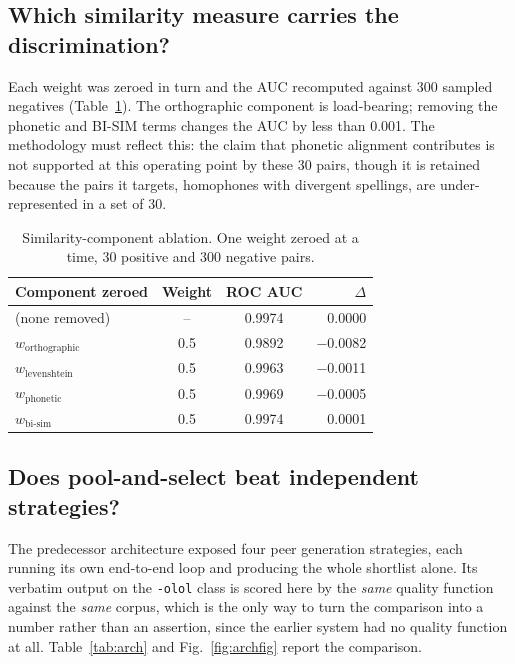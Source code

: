 \documentclass[conference]{IEEEtran}
\newcommand{\code}[1]{\texttt{\footnotesize #1}}
\begin{document}
\subsection{Which similarity measure carries the discrimination?}

Each weight was zeroed in turn and the AUC recomputed against 300 sampled
negatives (Table~\ref{tab:ablate-sim}). The orthographic component is
load-bearing; removing the phonetic and BI-SIM terms changes the AUC by less
than 0.001. The methodology must reflect this: the claim that phonetic alignment
contributes is not supported at this operating point by these 30 pairs, though
it is retained because the pairs it targets, homophones with divergent
spellings, are under-represented in a set of 30.

\begin{table}[t]
\caption{Similarity-component ablation. One weight zeroed at a time,
30 positive and 300 negative pairs.}
\label{tab:ablate-sim}
\centering
\footnotesize
\begin{tabular}{lccr}
\toprule
Component zeroed & Weight & ROC AUC & $\Delta$ \\
\midrule
(none removed)              & --   & 0.9974 & \phantom{$-$}0.0000 \\
$w_{\mathrm{orthographic}}$ & 0.5  & 0.9892 & $-$0.0082 \\
$w_{\mathrm{levenshtein}}$  & 0.5  & 0.9963 & $-$0.0011 \\
$w_{\mathrm{phonetic}}$     & 0.5  & 0.9969 & $-$0.0005 \\
$w_{\mathrm{bi\text{-}sim}}$& 0.5  & 0.9974 & \phantom{$-$}0.0001 \\
\bottomrule
\end{tabular}
\end{table}

\subsection{Does pool-and-select beat independent strategies?}

The predecessor architecture exposed four peer generation strategies, each
running its own end-to-end loop and producing the whole shortlist alone. Its
verbatim output on the \code{-olol} class is scored here by the \emph{same}
quality function against the \emph{same} corpus, which is the only way to turn
the comparison into a number rather than an assertion, since the earlier system
had no quality function at all. Table~\ref{tab:arch} and Fig.~\ref{fig:archfig}
report the comparison.
\end{document}
